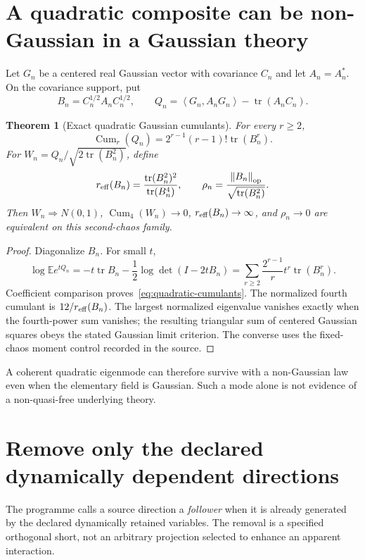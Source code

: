 \documentclass[11pt,a4paper,oneside]{book}
\theoremstyle{plain}
\newtheorem{theorem}{Theorem}[chapter]
\theoremstyle{definition}
\theoremstyle{remark}
\newcommand{\E}{\mathbb E}
\newcommand{\tr}{\operatorname{tr}}
\newcommand{\Cum}{\operatorname{Cum}}
\newcommand{\norm}[1]{\left\lVert#1\right\rVert}
\newcommand{\pair}[2]{\left\langle#1,#2\right\rangle}
\newcommand{\src}[2]{\cite{#1}}
\begin{document}
\section{A quadratic composite can be non-Gaussian in a Gaussian theory}
Let $G_n$ be a centered real Gaussian vector with covariance $C_n$ and let $A_n=A_n^*$. On the covariance support, put
\begin{equation}
 B_n=C_n^{1/2}A_nC_n^{1/2},\qquad
 Q_n=\pair{G_n}{A_nG_n}-\tr(A_nC_n).
 \label{eq:quadratic-score}
\end{equation}

\begin{theorem}[Exact quadratic Gaussian cumulants]
\label{thm:quadratic-cumulants}
For every $r\ge2$,
\begin{equation}
 \Cum_r(Q_n)=2^{r-1}(r-1)!\tr(B_n^r).
 \label{eq:quadratic-cumulants}
\end{equation}
For $W_n=Q_n/\sqrt{2\tr(B_n^2)}$, define
\begin{equation}
 r_{\rm eff}(B_n)=\frac{\tr(B_n^2)^2}{\tr(B_n^4)},\qquad
 \rho_n=\frac{\norm{B_n}_{\rm op}}{\sqrt{\tr(B_n^2)}}.
\end{equation}
Then $W_n\Rightarrow N(0,1)$, $\Cum_4(W_n)\to0$, $r_{\rm eff}(B_n)\to\infty$, and $\rho_n\to0$ are equivalent on this second-chaos family.
\end{theorem}
\begin{proof}
Diagonalize $B_n$. For small $t$,
\begin{equation}
 \log\E e^{tQ_n}
 =-t\tr B_n-\frac12\log\det(I-2tB_n)
 =\sum_{r\ge2}\frac{2^{r-1}}r t^r\tr(B_n^r).
\end{equation}
Coefficient comparison proves~\eqref{eq:quadratic-cumulants}. The normalized fourth cumulant is $12/r_{\rm eff}(B_n)$. The largest normalized eigenvalue vanishes exactly when the fourth-power sum vanishes; the resulting triangular sum of centered Gaussian squares obeys the stated Gaussian limit criterion. The converse uses the fixed-chaos moment control recorded in the source.
\end{proof}
\src{R18}{thm:v18v38-quadratic-cumulants,thm:v18v38-spectral-equivalence}
A coherent quadratic eigenmode can therefore survive with a non-Gaussian law even when the elementary field is Gaussian. Such a mode alone is not evidence of a non-quasi-free underlying theory.

\section{Remove only the declared dynamically dependent directions}
The programme calls a source direction a \emph{follower} when it is already generated by the declared dynamically retained variables. The removal is a specified orthogonal short, not an arbitrary projection selected to enhance an apparent interaction.
\end{document}
